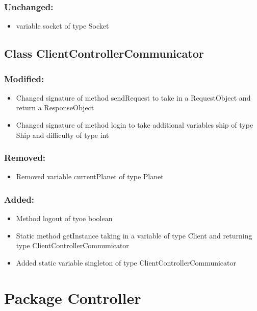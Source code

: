 \documentclass{article}
\begin{document}
\subsubsection{Unchanged:}
\begin{itemize}
\item variable socket of type Socket
\end{itemize}


\subsection{Class ClientControllerCommunicator}

\subsubsection{Modified:}
\begin{itemize}
\item Changed signature of method sendRequest to take in a RequestObject and return a ResponseObject
\item Changed signature of method login to take additional variables ship of type Ship and difficulty of type int
\end{itemize}

\subsubsection{Removed:}
\begin{itemize}
\item Removed variable currentPlanet of type Planet
\end{itemize}

\subsubsection{Added:}
\begin{itemize}
\item Method logout of tyoe boolean
\item Static method getInstance taking in a variable of type Client and returning type ClientControllerCommunicator
\item Added static variable singleton of type ClientControllerCommunicator 
\end{itemize}


\section{Package Controller}
\end{document}
